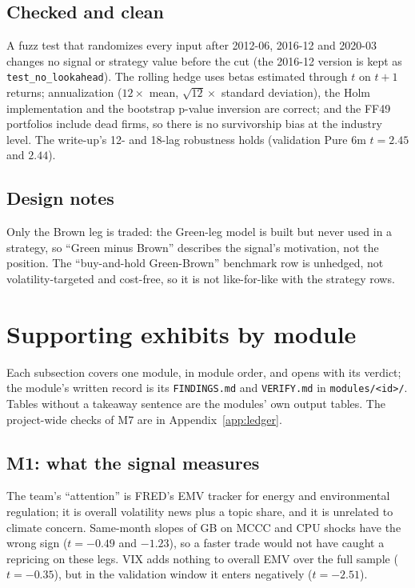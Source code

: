 \subsection{Checked and clean}
A fuzz test that randomizes every input after 2012-06, 2016-12 and 2020-03 changes no signal or strategy value before the cut (the 2016-12 version is kept as \texttt{test\_no\_lookahead}). The rolling hedge uses betas estimated through $t$ on $t+1$ returns; annualization ($12\times$ mean, $\sqrt{12}\times$ standard deviation), the Holm implementation and the bootstrap p-value inversion are correct; and the FF49 portfolios include dead firms, so there is no survivorship bias at the industry level. The write-up's 12- and 18-lag robustness holds (validation Pure 6m $t=2.45$ and $2.44$).

\subsection{Design notes}
Only the Brown leg is traded: the Green-leg model is built but never used in a strategy, so ``Green minus Brown'' describes the signal's motivation, not the position. The ``buy-and-hold Green-Brown'' benchmark row is unhedged, not volatility-targeted and cost-free, so it is not like-for-like with the strategy rows.

\clearpage
\section{Supporting exhibits by module}
\label{app:modules}

Each subsection covers one module, in module order, and opens with its verdict; the module's written record is its \texttt{FINDINGS.md} and \texttt{VERIFY.md} in \texttt{modules/<id>/}. Tables without a takeaway sentence are the modules' own output tables. The project-wide checks of M7 are in Appendix~\ref{app:ledger}.

\subsection{M1: what the signal measures}
\label{app:m1}
The team's ``attention'' is FRED's EMV tracker for energy and environmental regulation; it is overall volatility news plus a topic share, and it is unrelated to climate concern. Same-month slopes of GB on MCCC and CPU shocks have the wrong sign ($t=-0.49$ and $-1.23$), so a faster trade would not have caught a \citet{pst2022} repricing on these legs. VIX adds nothing to overall EMV over the full sample ($t=-0.35$), but in the validation window it enters negatively ($t=-2.51$).


